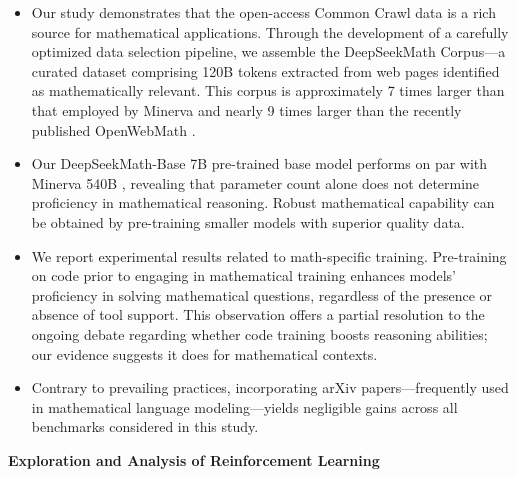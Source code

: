 \begin{itemize}[topsep=0pt]
    \item Our study demonstrates that the open-access Common Crawl data is a rich source for mathematical applications. Through the development of a carefully optimized data selection pipeline, we assemble the DeepSeekMath Corpus—a curated dataset comprising 120B tokens extracted from web pages identified as mathematically relevant. This corpus is approximately 7 times larger than that employed by Minerva \citep{minerva} and nearly 9 times larger than the recently published OpenWebMath \citep{openwebmath}.

    \item Our DeepSeekMath-Base 7B pre-trained base model performs on par with Minerva 540B \citep{minerva}, revealing that parameter count alone does not determine proficiency in mathematical reasoning. Robust mathematical capability can be obtained by pre-training smaller models with superior quality data.

    \item We report experimental results related to math-specific training. Pre-training on code prior to engaging in mathematical training enhances models' proficiency in solving mathematical questions, regardless of the presence or absence of tool support. This observation offers a partial resolution to the ongoing debate regarding whether code training boosts reasoning abilities; our evidence suggests it does for mathematical contexts.

    \item Contrary to prevailing practices, incorporating arXiv papers—frequently used in mathematical language modeling—yields negligible gains across all benchmarks considered in this study.
\end{itemize}

\textbf{Exploration and Analysis of Reinforcement Learning}

